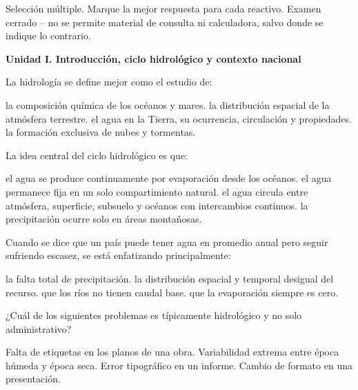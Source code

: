 \begin{icvnote}[Instrucciones]
Selección múltiple. Marque la mejor respuesta para cada reactivo. Examen
cerrado -- no se permite material de consulta ni calculadora, salvo
donde se indique lo contrario.
\end{icvnote}

\begin{questions}

\item[]\textbf{Unidad I. Introducción, ciclo hidrológico y contexto nacional}\par\medskip

\question[2] La hidrología se define mejor como el estudio de:
\begin{choices}
  \choice la composición química de los océanos y mares.
  \choice la distribución espacial de la atmósfera terrestre.
  \CorrectChoice el agua en la Tierra, su ocurrencia, circulación y propiedades.
  \choice la formación exclusiva de nubes y tormentas.
\end{choices}

\question[2] La idea central del ciclo hidrológico es que:
\begin{choices}
  \choice el agua se produce continuamente por evaporación desde los océanos.
  \choice el agua permanece fija en un solo compartimiento natural.
  \CorrectChoice el agua circula entre atmósfera, superficie, subsuelo y océanos con intercambios continuos.
  \choice la precipitación ocurre solo en áreas montañosas.
\end{choices}

\question[3] Cuando se dice que un país puede tener agua en promedio anual
pero seguir sufriendo escasez, se está enfatizando principalmente:
\begin{choices}
  \choice la falta total de precipitación.
  \CorrectChoice la distribución espacial y temporal desigual del recurso.
  \choice que los ríos no tienen caudal base.
  \choice que la evaporación siempre es cero.
\end{choices}

\question[3] ¿Cuál de los siguientes problemas es típicamente hidrológico
y no solo administrativo?
\begin{choices}
  \choice Falta de etiquetas en los planos de una obra.
  \CorrectChoice Variabilidad extrema entre época húmeda y época seca.
  \choice Error tipográfico en un informe.
  \choice Cambio de formato en una presentación.
\end{choices}


\end{questions}
